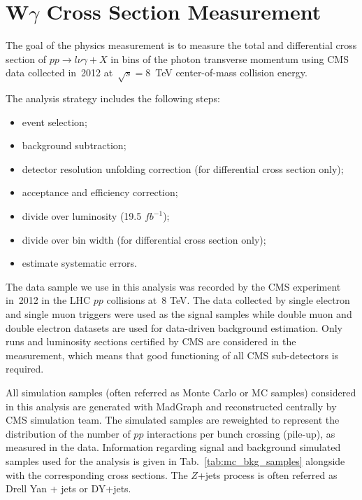 \chapter{W$\gamma$ Cross Section Measurement}
\label{sec:AN_WgMeas}

The goal of the physics measurement is to measure the total and differential cross section of $pp \rightarrow l\nu\gamma + X$ in bins of the photon transverse momentum using CMS data collected in~2012 at~$\sqrt{s}=8$~TeV center-of-mass collision energy. 

The analysis strategy includes the following steps:
\begin{itemize}
  \item event selection;
  \item background subtraction;
  \item detector resolution unfolding correction (for differential cross section only);
  \item acceptance and efficiency correction;
  \item divide over luminosity (19.5 $fb^{-1}$);
  \item divide over bin width (for differential cross section only);
  \item estimate systematic errors.
\end{itemize}

The data sample we use in this analysis was recorded by the CMS experiment in~2012 in the LHC $pp$ collisions at~8 TeV. The data collected by single electron and single muon triggers were used as the signal samples while double muon and double electron datasets are used for data-driven background estimation. Only runs and luminosity sections certified by CMS are considered in the measurement, which means that good functioning of all CMS sub-detectors is required.

All simulation samples (often referred as Monte Carlo or MC samples) considered in this analysis are generated with MadGraph and reconstructed centrally by CMS simulation team. The simulated samples are reweighted to represent the distribution of the number of $pp$ interactions per bunch crossing (pile-up), as measured in the data. Information regarding signal and background simulated samples used for the analysis is given in Tab.~\ref{tab:mc_bkg_samples} alongside with the corresponding cross sections. The $Z$+jets process is often referred as Drell Yan + jets or DY+jets.

